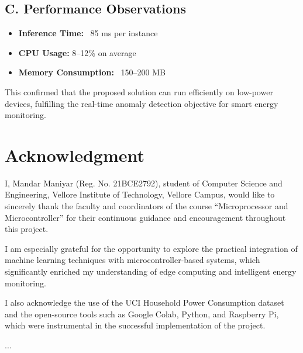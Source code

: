 \documentclass[12pt, draftclsnofoot, onecolumn]{IEEEtran}
\begin{document}
\subsection{C. Performance Observations}

\begin{itemize}
	\item \textbf{Inference Time:} ~85 ms per instance
	\item \textbf{CPU Usage:} 8–12\% on average
	\item \textbf{Memory Consumption:} ~150–200 MB
\end{itemize}

This confirmed that the proposed solution can run efficiently on low-power devices, fulfilling the real-time anomaly detection objective for smart energy monitoring.

\vspace{140pt}

\section*{Acknowledgment}
I, Mandar Maniyar (Reg. No. 21BCE2792), student of Computer Science and Engineering, Vellore Institute of Technology, Vellore Campus, would like to sincerely thank the faculty and coordinators of the course “Microprocessor and Microcontroller” for their continuous guidance and encouragement throughout this project.

I am especially grateful for the opportunity to explore the practical integration of machine learning techniques with microcontroller-based systems, which significantly enriched my understanding of edge computing and intelligent energy monitoring.

I also acknowledge the use of the UCI Household Power Consumption dataset and the open-source tools such as Google Colab, Python, and Raspberry Pi, which were instrumental in the successful implementation of the project.

...


\nocite{*}

\end{document}
